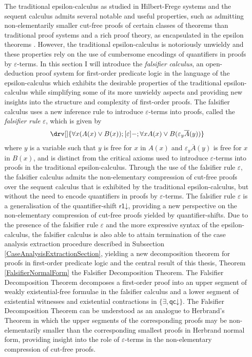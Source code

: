 \documentclass[10pt]{article}
\theoremstyle{definition}\newtheorem{remark}[theorem]{Remark}
\theoremstyle{definition}\newtheorem{example}[theorem]{Example}
\theoremstyle{definition}\newtheorem{definition}[theorem]{Definition}
\newcommand{\qcDown}{{\mathsf{qc\mathord\downarrow}}}
\newcommand{\rOneDown}{{\mathsf{r1\mathord\downarrow}}}
\newcommand{\falsifierRule}{{\mathsf{\varepsilon}}}
\begin{document}
	\noindent
	The traditional epsilon-calculus as studied in Hilbert-Frege systems and the sequent calculus admits several notable and useful properties, such as admitting non-elementarily smaller cut-free proofs of certain classes of theorems than traditional proof systems \cite{BaazLolicEpsilonShorterProofs} and a rich proof theory, as encapsulated in the epsilon theorems \cite{MoserZachEpsilonCalculusAndHerbrand}. However, the traditional epsilon-calculus is notoriously unwieldy and these properties rely on the use of cumbersome encodings of quantifiers in proofs by $\varepsilon$-terms. In this section I will introduce the \textit{falsifier calculus}, an open-deduction proof system for first-order predicate logic in the language of the epsilon-calculus which exhibits the desirable properties of the traditional epsilon-calculus while simplifying some of its more unwieldy aspects and providing new insights into the structure and complexity of first-order proofs. The falsifier calculus uses a new inference rule to introduce $\varepsilon$-terms into proofs, called the \textit{falsifier rule} $\falsifierRule$, which is given by
	\[
	\drv[] {
		\forall x (A(x) \lor B(x)) ; [\falsifierRule]- ; \forall x A(x) \lor B(\varepsilon_y \overline{A}(y))
	}
	\]
	where $y$ is a variable such that $y$ is free for $x$ in $A(x)$ and $\varepsilon_y \overline{A}(y)$ is free for $x$ in $B(x)$, and is distinct from the critical axioms used to introduce $\varepsilon$-terms into proofs in the traditional epsilon-calculus. Through the use of the falsifier rule $\falsifierRule$, the falsifier calculus admits the non-elementary compression of cut-free proofs over the sequent calculus that is exhibited by the traditional epsilon-calculus, but without the need to encode quantifiers in proofs by $\varepsilon$-terms. The falsifier rule $\falsifierRule$ is a generalisation of the quantifier-shift $\rOneDown$, providing a new perspective on the non-elementary compression of cut-free proofs yielded by quantifier-shifts. Due to the presence of the falsifier rule $\varepsilon$ and the more expressive syntax of the epsilon-calculus, the falsifier calculus is also able to attain termination of the case analysis extraction procedure described in Subsection \ref{CaseAnalysisExtractionSection}, yielding a new decomposition theorem for proofs in first-order predicate logic and the central result of this thesis, Theorem \ref{FalsifierNormalForm} the Falsifier Decomposition Theorem. The Falsifier Decomposition Theorem decomposes a first-order proof into an upper segment of weakly existential-free formulae in the falsifier calculus and a lower segment of existential witnesses and existential contractions in $\{\exists, \qcDown\}$. The Falsifier Decomposition Theorem can be understood as an analogue to Herbrand's Theorem in which the upper segments of the corresponding proofs may be non-elementarily smaller than the corresponding smallest proofs in Herbrand normal form, providing insight into the role of $\varepsilon$-terms in the non-elementary compression of cut-free proofs.
	
\end{document}
